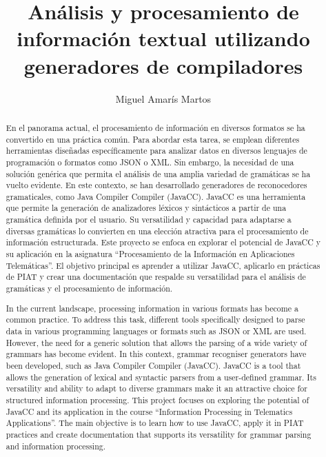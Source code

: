 \documentclass[12pt,a4paper]{report}
\title{Análisis y procesamiento de información textual utilizando generadores de compiladores}
\author{Miguel Amarís Martos}
\begin{document}
\hypersetup{pageanchor=false}
\begin{titlepage}
    \thispagestyle{empty}
    
\end{titlepage}

\newpage
\begin{abstract}
    En el panorama actual, el procesamiento de información en diversos formatos se ha convertido en una práctica común. Para abordar esta tarea, se emplean diferentes herramientas diseñadas específicamente para analizar datos en diversos lenguajes de programación o formatos como JSON o XML. Sin embargo, la necesidad de una solución genérica que permita el análisis de una amplia variedad de gramáticas se ha vuelto evidente.
    En este contexto, se han desarrollado generadores de reconocedores gramaticales, como Java Compiler Compiler (JavaCC). JavaCC es una herramienta que permite la generación de analizadores léxicos y sintácticos a partir de una gramática definida por el usuario. Su versatilidad y capacidad para adaptarse a diversas gramáticas lo convierten en una elección atractiva para el procesamiento de información estructurada.
    Este proyecto se enfoca en explorar el potencial de JavaCC y su aplicación en la asignatura ``Procesamiento de la Información en Aplicaciones Telemáticas''. El objetivo principal es aprender a utilizar JavaCC, aplicarlo en prácticas de PIAT y crear una documentación que respalde su versatilidad para el análisis de gramáticas y el procesamiento de información.
\end{abstract}
\renewcommand{\abstractname}{Abstract} %
\newpage
\vspace{10cm}
\begin{abstract}
    In the current landscape, processing information in various formats has become a common practice. To address this task, different tools specifically designed to parse data in various programming languages or formats such as JSON or XML are used. However, the need for a generic solution that allows the parsing of a wide variety of grammars has become evident.
    In this context, grammar recogniser generators have been developed, such as Java Compiler Compiler (JavaCC). JavaCC is a tool that allows the generation of lexical and syntactic parsers from a user-defined grammar. Its versatility and ability to adapt to diverse grammars make it an attractive choice for structured information processing.
    This project focuses on exploring the potential of JavaCC and its application in the course ``Information Processing in Telematics Applications''. The main objective is to learn how to use JavaCC, apply it in PIAT practices and create documentation that supports its versatility for grammar parsing and information processing.
\end{abstract}
\end{document}
